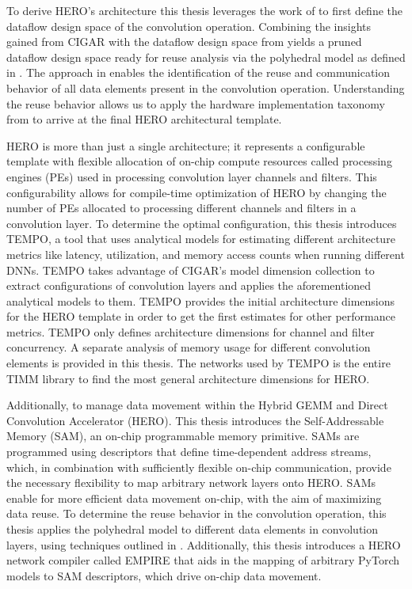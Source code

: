 To derive HERO's architecture this thesis leverages the work of
\cite{dnn_df_overrated} to first define the dataflow design space of the
convolution operation. Combining the insights gained from CIGAR with the
dataflow design space from \cite{dnn_df_overrated} yields a pruned dataflow
design space ready for reuse analysis via the polyhedral model as defined in
\cite{meeus}. The approach in \cite{meeus} enables the identification of the
reuse and communication behavior of all data elements present in the convolution
operation. Understanding the reuse behavior allows us to apply the hardware
implementation taxonomy from \cite{maestro} to arrive at the final HERO
architectural template.


HERO is more than just a single architecture; it represents a configurable
template with flexible allocation of on-chip compute resources called processing
engines (PEs) used in processing convolution layer channels and filters. This
configurability allows for compile-time optimization of HERO by changing the
number of PEs allocated to processing different channels and filters in a
convolution layer. To determine the optimal configuration, this thesis
introduces TEMPO, a tool that uses analytical models for estimating different
architecture metrics like latency, utilization, and memory access counts when
running different DNNs. TEMPO takes advantage of CIGAR's model dimension
collection to extract configurations of convolution layers and applies the
aforementioned analytical models to them. TEMPO provides the initial
architecture dimensions for the HERO template in order to get the first
estimates for other performance metrics. TEMPO only defines architecture dimensions for
channel and filter concurrency. A separate analysis of memory usage for
different convolution elements is provided in this thesis. The networks  used by
TEMPO is the entire TIMM library to find the most general architecture
dimensions for HERO.


Additionally, to manage data movement within the Hybrid GEMM and Direct
Convolution Accelerator (HERO). This thesis introduces the Self-Addressable
Memory (SAM), an on-chip programmable memory primitive. SAMs are programmed
using descriptors that define time-dependent address streams, which, in
combination with sufficiently flexible on-chip communication, provide the
necessary flexibility to map arbitrary network layers onto HERO. SAMs enable for
more efficient data movement on-chip, with the aim of maximizing data reuse. To
determine the reuse behavior in the convolution operation, this thesis applies
the polyhedral model to different data elements in convolution layers, using
techniques outlined in \cite{meeus}. Additionally, this thesis introduces a HERO
network compiler called EMPIRE that aids in the mapping of arbitrary PyTorch
models to SAM descriptors, which drive on-chip data movement.


